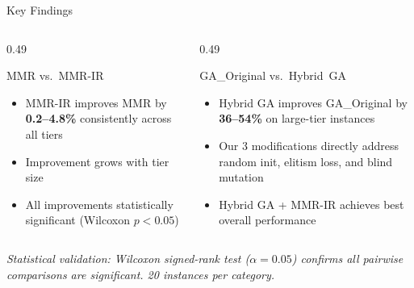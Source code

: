 \documentclass[aspectratio=169,10pt]{beamer}
\begin{document}
\begin{frame}{Key Findings}


  \vspace{0.25cm}
  \begin{columns}[T]
    \begin{column}{0.49\textwidth}
      \begin{block}{MMR vs.\ MMR-IR}
        {\small
        \begin{itemize}\itemsep3pt
          \item MMR-IR improves MMR by
            \textbf{0.2--4.8\%} consistently across all tiers
          \item Improvement grows with tier size
          \item All improvements statistically significant
            (Wilcoxon $p < 0.05$)
        \end{itemize}
        }
      \end{block}
    \end{column}
    \begin{column}{0.49\textwidth}
      \begin{block}{GA\_Original vs.\ Hybrid~GA}
        {\small
        \begin{itemize}\itemsep3pt
          \item Hybrid GA improves GA\_Original by
            \textbf{36--54\%} on large-tier instances
          \item Our 3 modifications directly address
            random init, elitism loss, and blind mutation
          \item Hybrid GA + MMR-IR achieves
            best overall performance
        \end{itemize}
        }
      \end{block}
    \end{column}
  \end{columns}

  \vspace{0.2cm}
  \colorbox{navymidHex}{\begin{minipage}{\linewidth}
    \vspace{5pt}
    {\color{teallt}\small\itshape\centering
     Statistical validation: Wilcoxon signed-rank test ($\alpha = 0.05$) confirms all
     pairwise comparisons are significant. 20 instances per category.\par}
    \vspace{5pt}
  \end{minipage}}

\end{frame}
\end{document}
